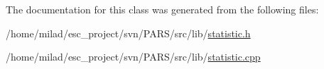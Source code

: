 The documentation for this class was generated from the following files:\begin{DoxyCompactItemize}
\item 
/home/milad/esc\_\-project/svn/PARS/src/lib/\hyperlink{statistic_8h}{statistic.h}\item 
/home/milad/esc\_\-project/svn/PARS/src/lib/\hyperlink{statistic_8cpp}{statistic.cpp}\end{DoxyCompactItemize}
